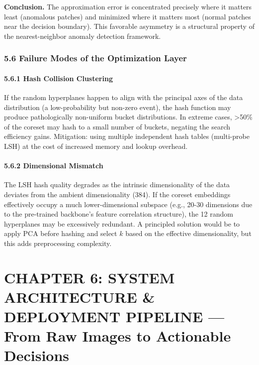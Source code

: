 \documentclass[12pt, a4paper, oneside]{report}
\begin{document}
\textbf{Conclusion.} The approximation error is concentrated precisely where it matters least (anomalous patches) and minimized where it matters most (normal patches near the decision boundary). This favorable asymmetry is a structural property of the nearest-neighbor anomaly detection framework.

\bigskip\noindent\hrulefill\bigskip

\subsection{5.6 Failure Modes of the Optimization Layer}\label{failure-modes-of-the-optimization-layer}

\subsubsection{5.6.1 Hash Collision Clustering}\label{hash-collision-clustering}

If the random hyperplanes happen to align with the principal axes of the data distribution (a low-probability but non-zero event), the hash function may produce pathologically non-uniform bucket distributions. In extreme cases, \textgreater50\% of the coreset may hash to a small number of buckets, negating the search efficiency gains. Mitigation: using multiple independent hash tables (multi-probe LSH) at the cost of increased memory and lookup overhead.

\subsubsection{5.6.2 Dimensional Mismatch}\label{dimensional-mismatch}

The LSH hash quality degrades as the intrinsic dimensionality of the data deviates from the ambient dimensionality (384). If the coreset embeddings effectively occupy a much lower-dimensional subspace (e.g., 20-30 dimensions due to the pre-trained backbone's feature correlation structure), the 12 random hyperplanes may be excessively redundant. A principled solution would be to apply PCA before hashing and select \(k\) based on the effective dimensionality, but this adds preprocessing complexity.

\bigskip\noindent\hrulefill\bigskip

\chapter{CHAPTER 6: SYSTEM ARCHITECTURE \& DEPLOYMENT PIPELINE --- From Raw Images to Actionable Decisions}\label{chapter-6-system-architecture-deployment-pipeline-from-raw-images-to-actionable-decisions}
\end{document}
